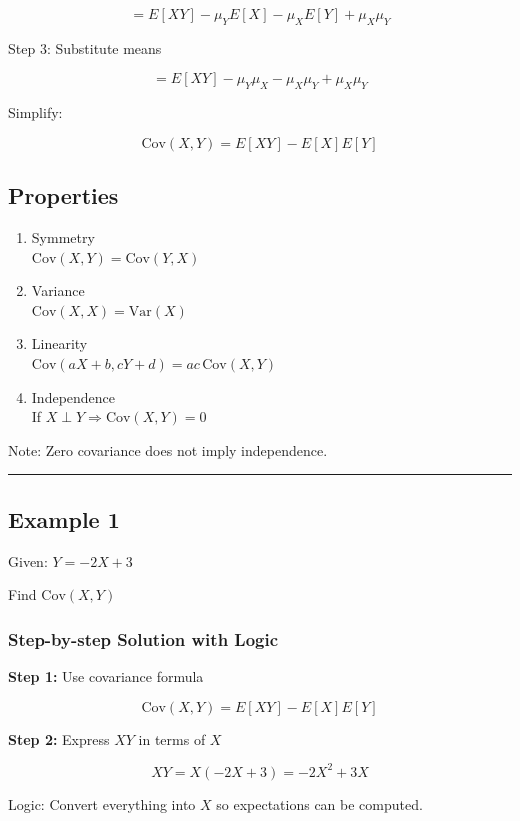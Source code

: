 \documentclass[12pt]{article}
\begin{document}
\[
= E[XY] - \mu_YE[X] - \mu_XE[Y] + \mu_X\mu_Y
\]

Step 3: Substitute means

\[
= E[XY] - \mu_Y\mu_X - \mu_X\mu_Y + \mu_X\mu_Y
\]

Simplify:

\[
\mathrm{Cov}(X,Y) = E[XY] - E[X]E[Y]
\]

\subsection{Properties}

\begin{enumerate}
\item Symmetry \\
$\mathrm{Cov}(X,Y) = \mathrm{Cov}(Y,X)$

\item Variance \\
$\mathrm{Cov}(X,X) = \mathrm{Var}(X)$

\item Linearity \\
$\mathrm{Cov}(aX + b, cY + d) = ac \, \mathrm{Cov}(X,Y)$

\item Independence \\
If $X \perp Y \Rightarrow \mathrm{Cov}(X,Y) = 0$
\end{enumerate}

Note: Zero covariance does not imply independence.

\hrule
\vspace{0.5cm}

\subsection{Example 1}

Given: $Y = -2X + 3$

Find $\mathrm{Cov}(X,Y)$

\subsubsection*{Step-by-step Solution with Logic}

\textbf{Step 1:} Use covariance formula

\[
\mathrm{Cov}(X,Y) = E[XY] - E[X]E[Y]
\]

\textbf{Step 2:} Express $XY$ in terms of $X$

\[
XY = X(-2X + 3) = -2X^2 + 3X
\]

Logic: Convert everything into $X$ so expectations can be computed.
\end{document}
